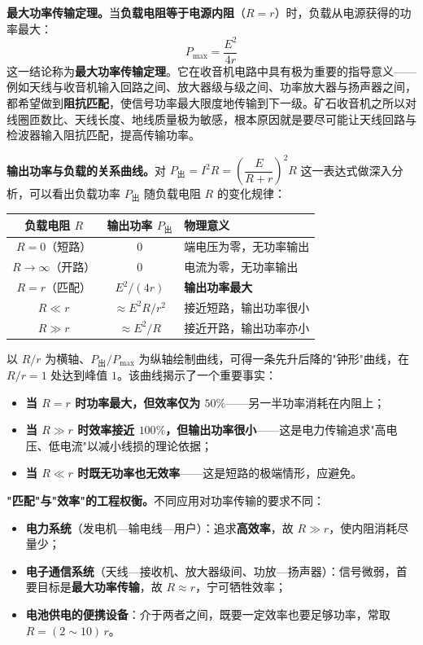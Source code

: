 \documentclass[12pt,UTF8]{ctexbook}
\begin{document}
\textbf{最大功率传输定理。}当\textbf{负载电阻等于电源内阻}（$R = r$）时，负载从电源获得的功率最大：
\[
P_{\max} = \frac{E^2}{4r}
\]
这一结论称为\textbf{最大功率传输定理}。它在收音机电路中具有极为重要的指导意义——例如天线与收音机输入回路之间、放大器级与级之间、功率放大器与扬声器之间，都希望做到\textbf{阻抗匹配}，使信号功率最大限度地传输到下一级。矿石收音机之所以对线圈匝数比、天线长度、地线质量极为敏感，根本原因就是要尽可能让天线回路与检波器输入阻抗匹配，提高传输功率。

\textbf{输出功率与负载的关系曲线。}对 $P_{\text{出}} = I^2 R = \left(\dfrac{E}{R+r}\right)^2 R$ 这一表达式做深入分析，可以看出负载功率 $P_{\text{出}}$ 随负载电阻 $R$ 的变化规律：

\begin{center}
\begin{tabular}{ccl}
\hline
\textbf{负载电阻 $R$} & \textbf{输出功率 $P_{\text{出}}$} & \textbf{物理意义} \\
\hline
$R = 0$（短路） & $0$ & 端电压为零，无功率输出 \\
$R \to \infty$（开路） & $0$ & 电流为零，无功率输出 \\
$R = r$（匹配） & $E^2/(4r)$ & \textbf{输出功率最大} \\
$R \ll r$ & $\approx E^2 R / r^2$ & 接近短路，输出功率很小 \\
$R \gg r$ & $\approx E^2 / R$ & 接近开路，输出功率亦小 \\
\hline
\end{tabular}
\end{center}


以 $R/r$ 为横轴、$P_{\text{出}}/P_{\max}$ 为纵轴绘制曲线，可得一条先升后降的"钟形"曲线，在 $R/r = 1$ 处达到峰值 $1$。该曲线揭示了一个重要事实：

\begin{itemize}
  \item \textbf{当 $R = r$ 时功率最大，但效率仅为 $50\%$}——另一半功率消耗在内阻上；
  \item \textbf{当 $R \gg r$ 时效率接近 $100\%$，但输出功率很小}——这是电力传输追求"高电压、低电流"以减小线损的理论依据；
  \item \textbf{当 $R \ll r$ 时既无功率也无效率}——这是短路的极端情形，应避免。
\end{itemize}

\textbf{"匹配"与"效率"的工程权衡。}不同应用对功率传输的要求不同：
\begin{itemize}
  \item \textbf{电力系统}（发电机—输电线—用户）：追求\textbf{高效率}，故 $R \gg r$，使内阻消耗尽量少；
  \item \textbf{电子通信系统}（天线—接收机、放大器级间、功放—扬声器）：信号微弱，首要目标是\textbf{最大功率传输}，故 $R \approx r$，宁可牺牲效率；
  \item \textbf{电池供电的便携设备}：介于两者之间，既要一定效率也要足够功率，常取 $R = (2\sim10)\,r$。
\end{itemize}
\end{document}
